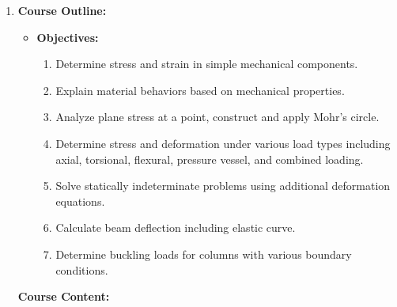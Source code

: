 \documentclass{article}
\begin{document}
\begin{enumerate}
    \item \textbf{Course Outline:}
        \begin{itemize}
            \item \textbf{Objectives:}
                \begin{enumerate}
                    \item Determine stress and strain in simple mechanical components.
                    \item Explain material behaviors based on mechanical properties.
                    \item Analyze plane stress at a point, construct and apply Mohr's circle.
                    \item Determine stress and deformation under various load types including axial, torsional, flexural, pressure vessel, and combined loading.
                    \item Solve statically indeterminate problems using additional deformation equations.
                    \item Calculate beam deflection including elastic curve.
                    \item Determine buckling loads for columns with various boundary conditions.
                \end{enumerate}
        \end{itemize}

        \textbf{Course Content:}


\end{enumerate}
\end{document}
